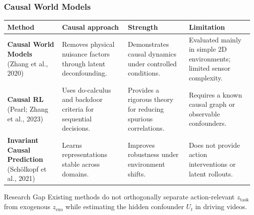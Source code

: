 \begin{frame}
  \frametitle{Causal World Models}
  \setlength{\tabcolsep}{2pt}
  \renewcommand{\arraystretch}{1.2}
  \small
  \begin{tabular}{>{\raggedright\arraybackslash}p{}|>{\raggedright\arraybackslash}p{}|>{\raggedright\arraybackslash}p{}|>{\raggedright\arraybackslash}p{}}
    \textbf{Method} & \textbf{Causal approach} & \textbf{Strength} & \textbf{Limitation} \\
    \hline
    \textbf{Causal World Models} (Zhang et al., 2020) & Removes physical nuisance factors through latent deconfounding. & Demonstrates causal dynamics under controlled conditions. & Evaluated mainly in simple 2D environments; limited sensor complexity. \\
    \textbf{Causal RL} (Pearl; Zhang et al., 2023) & Uses do-calculus and backdoor criteria for sequential decisions. & Provides a rigorous theory for reducing spurious correlations. & Requires a known causal graph or observable confounders. \\
    \textbf{Invariant Causal Prediction} (Schölkopf et al., 2021) & Learns representations stable across domains. & Improves robustness under environment shifts. & Does not provide action interventions or latent rollouts. \\
  \end{tabular}
  \vspace{0.5em}
  \begin{block}{Research Gap}
    Existing methods do not orthogonally separate action-relevant $z_{\text{task}}$ from exogenous $z_{\text{exo}}$ while estimating the hidden confounder $U_t$ in driving videos.
  \end{block}
\end{frame}

